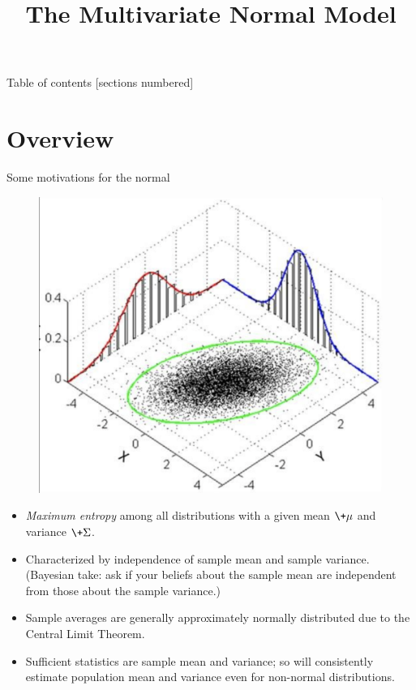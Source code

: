 \documentclass[10pt]{beamer}
\title{The Multivariate Normal Model}
\begin{document}
\maketitle

\begin{frame}{Table of contents}
  [sections numbered] \tableofcontents[hideallsubsections]
\end{frame}


\section{Overview}

\begin{frame}{Some motivations for the normal}

\begin{figure}
\includegraphics[width=.3\textwidth]{images/mvn}
\end{figure}

\begin{itemize}
	\item \textit{Maximum entropy} among all distributions with a given mean $\+\mu$ and variance $\+\Sigma$.  \pause
	\item Characterized by independence of sample mean and sample variance. {\footnotesize (Bayesian take: ask if your beliefs about the sample mean are independent from those about the sample variance.)} \pause
	\item Sample averages are generally approximately normally distributed due to the Central Limit Theorem. \pause 
	\item Sufficient statistics are sample mean and variance; so will consistently estimate population mean and variance even for non-normal distributions.
\end{itemize}
\end{frame}
\end{document}
